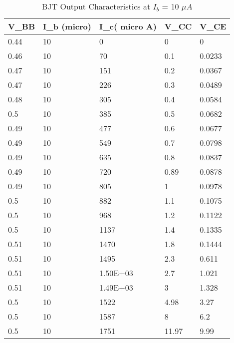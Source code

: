 \documentclass{scrartcl}
\newcommand{\1}{\mathbbm{1}}
\begin{document}
    \begin{table}[!ht]
        \centering
        \begin{tabular}{|l|l|l|l|l|}
        \hline
            \textbf{V\_BB} & \textbf{I\_b (micro)} & \textbf{I\_c( micro A)} & \textbf{V\_CC} & \textbf{V\_CE} \\ \hline
            0.44 & 10 & 0 & 0 & 0 \\ \hline
            0.46 & 10 & 70 & 0.1 & 0.0233 \\ \hline
            0.47 & 10 & 151 & 0.2 & 0.0367 \\ \hline
            0.47 & 10 & 226 & 0.3 & 0.0489 \\ \hline
            0.48 & 10 & 305 & 0.4 & 0.0584 \\ \hline
            0.5 & 10 & 385 & 0.5 & 0.0682 \\ \hline
            0.49 & 10 & 477 & 0.6 & 0.0677 \\ \hline
            0.49 & 10 & 549 & 0.7 & 0.0798 \\ \hline
            0.49 & 10 & 635 & 0.8 & 0.0837 \\ \hline
            0.49 & 10 & 720 & 0.89 & 0.0878 \\ \hline
            0.49 & 10 & 805 & 1 & 0.0978 \\ \hline
            0.5 & 10 & 882 & 1.1 & 0.1075 \\ \hline
            0.5 & 10 & 968 & 1.2 & 0.1122 \\ \hline
            0.5 & 10 & 1137 & 1.4 & 0.1335 \\ \hline
            0.51 & 10 & 1470 & 1.8 & 0.1444 \\ \hline
            0.51 & 10 & 1495 & 2.3 & 0.611 \\ \hline
            0.51 & 10 & 1.50E+03 & 2.7 & 1.021 \\ \hline
            0.51 & 10 & 1.49E+03 & 3 & 1.328 \\ \hline
            0.5 & 10 & 1522 & 4.98 & 3.27 \\ \hline
            0.5 & 10 & 1587 & 8 & 6.2 \\ \hline
            0.5 & 10 & 1751 & 11.97 & 9.99 \\ \hline
        \end{tabular}
        \caption{BJT Output Characteristics at $I_b$ = 10 $\mu A$}
        \label{tab:output10}
    \end{table}
\end{document}
